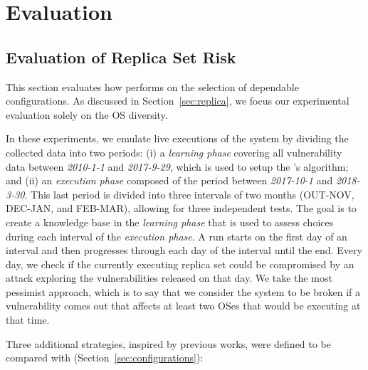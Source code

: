 \chapter{\system Evaluation}
\label{chap:lazarusevaluation}


\section{Evaluation of Replica Set Risk}
\label{sec:diversity}

This section evaluates how \system performs on the selection of dependable \replica configurations.
As discussed in Section~\ref{sec:replica}, we focus our experimental evaluation solely on the OS diversity.

In these experiments, we emulate live executions of the system by dividing the collected data into two periods:
(i) a \emph{learning phase} covering all vulnerability data between \emph{2010-1-1} and \emph{2017-9-29}, which is used to setup the \risk's algorithm; and (ii) an \emph{execution phase} composed of the period between \emph{2017-10-1} and \emph{2018-3-30}.
This last period is divided into three intervals of two months (OUT-NOV, DEC-JAN, and FEB-MAR), allowing for three independent tests.
The goal is to create a knowledge base in the \emph{learning phase} that is used to assess \system choices during each interval of the \emph{execution phase}. 
A run starts on the first day of an interval and then progresses through each day of the interval until the end. Every day, we check if the currently executing replica set could be compromised by an attack exploring the vulnerabilities released on that day. 
We take the most pessimist approach, which is to say that we consider the system to be broken if a vulnerability comes out that affects at least two OSes that would be executing at that time.

Three additional strategies, inspired by previous works, were defined to be compared with \system (Section~\ref{sec:configurations}):

